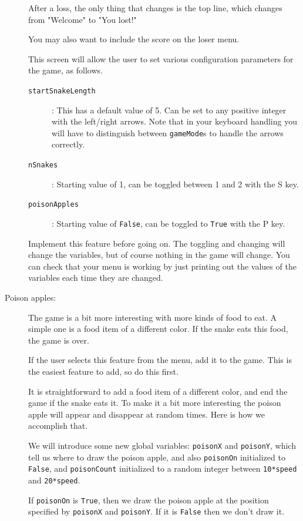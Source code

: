 \documentclass[12pt]{article}
\begin{document}
\begin{description}
After a loss, the only thing that changes is the top line,
which changes from "Welcome" to "You lost!"

You may also want to include the score on the loser menu.

This screen will allow the user to set various configuration
parameters for the game, as follows.

\begin{description}
\item[\tt startSnakeLength]:
This has a default value of 5.  Can be set to any positive
integer with the left/right arrows.  Note that in your
keyboard handling you will have to distinguish between
\lstinline{gameMode}s to handle the arrows correctly.
\item[\tt nSnakes]:  Starting value of 1,  can be
toggled between 1 and 2 with the S key.
\item[\tt poisonApples]: Starting value of \lstinline{False},
can be toggled to \lstinline{True} with the P key.
\end{description}

Implement this feature before going on.  The toggling and changing
will change the variables, but of course nothing in the game will
change.  You can check that your menu is working by just printing
out the values of the variables each time they are changed.

\item[Poison apples:]  The game is a bit more interesting with
more kinds of food to eat.  A simple one is a food item of a different
color. If the snake eats this food, the game is over.

If the user selects this feature from the menu, add it to
the game.  This is the easiest feature to add, so do this
first.

It is straightforward to add a food item of a different color,
and end the game if the snake eats it.  To make it a bit 
more interesting the poison apple will appear and disappear
at random times.  Here is how we accomplish that.

We will introduce some new global variables:
\lstinline{poisonX} and \lstinline{poisonY}, which tell us
where to draw the poison apple, and also \lstinline{poisonOn}
initialized to \lstinline{False},
and \lstinline{poisonCount} initialized to a random integer
between \lstinline{10*speed} and \lstinline{20*speed}.

If \lstinline{poisonOn} is \lstinline{True}, then we draw
the poison apple at the position specified by \lstinline{poisonX}
and \lstinline{poisonY}.  If it is \lstinline{False} then
we don't draw it.


\end{description}
\end{document}
